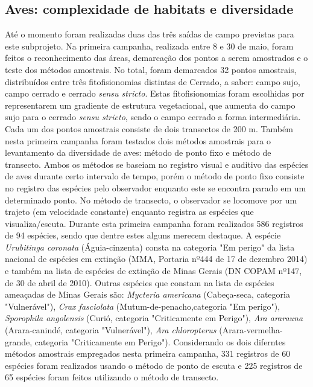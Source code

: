 \subsection{Aves: complexidade de habitats e diversidade} %
\label{sec:compl-de-habit} 


Até o momento foram realizadas duas das três saídas de campo previstas para este subprojeto. Na primeira campanha, realizada entre 8 e 30 de maio, foram feitos o reconhecimento das áreas, demarcação dos pontos a serem amostrados e o teste dos métodos amostrais. No total, foram demarcados 32 pontos amostrais, distribuídos entre três fitofisionomias distintas de Cerrado, a saber: campo sujo, campo cerrado e cerrado \textit{sensu stricto}. Estas fitofisionomias foram escolhidas por representarem um gradiente de estrutura vegetacional, que aumenta do campo sujo para o cerrado \textit{sensu stricto}, sendo o campo cerrado a forma intermediária. Cada um dos pontos amostrais consiste de dois transectos de 200 m. Também nesta primeira campanha foram testados dois métodos amostrais para o levantamento da diversidade de aves: método de ponto fixo e método de transecto. Ambos os métodos se baseiam no registro visual e auditivo das espécies de aves durante certo intervalo de tempo, porém o método de ponto fixo consiste no registro das espécies pelo observador enquanto este se encontra parado em um determinado ponto. No método de transecto, o observador se locomove por um trajeto (em velocidade constante) enquanto registra as espécies que visualiza/escuta.
Durante esta primeira campanha foram realizados 586 registros de 94 espécies, sendo que dentre estes alguns merecem destaque. A espécie \textit{Urubitinga coronata} (Águia-cinzenta) consta na categoria "Em perigo" da lista nacional de espécies em extinção (MMA, Portaria nº444 de 17 de dezembro 2014) e também na lista de espécies de extinção de Minas Gerais (DN COPAM nº147, de 30 de abril de 2010). Outras espécies que constam na lista de espécies ameaçadas de Minas Gerais são: \textit{Mycteria americana} (Cabeça-seca, categoria "Vulnerável"), \textit{Crax fasciolata} (Mutum-de-penacho,categoria "Em perigo"), \textit{Sporophila angolensis} (Curió, categoria "Criticamente em Perigo"), \textit{Ara ararauna}  (Arara-canindé, categoria "Vulnerável"), \textit{Ara chloropterus} (Arara-vermelha-grande, categoria "Criticamente em Perigo").
Considerando os dois diferntes métodos amostrais empregados nesta primeira campanha, 331 registros de 60 espécies foram realizados usando o método de ponto de escuta e 225 registros de 65 espécies foram feitos utilizando o método de transecto.
